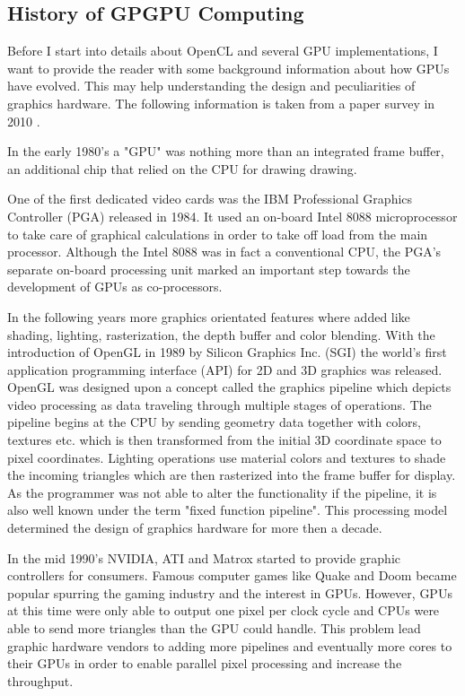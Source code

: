 \subsection{History of GPGPU Computing} 
\label{sec:history}
Before I start into details about OpenCL and several GPU implementations, I want to provide the reader with some background information about how GPUs have evolved. This may help understanding the design and peculiarities of graphics hardware. The following information is taken from a paper survey in 2010 \cite{gpu_history}.

In the early 1980's a "GPU" was nothing more than an integrated frame buffer, an additional chip that relied on the CPU for drawing drawing.

One of the first dedicated video cards was the IBM Professional Graphics Controller (PGA) released in 1984. It used an on-board Intel 8088 microprocessor to take care of graphical calculations in order to take off load from the main processor. Although the Intel 8088 was in fact a conventional CPU, the PGA's separate on-board processing unit marked an important step towards the development of GPUs as co-processors.

In the following years more graphics orientated features where added like shading, lighting, rasterization, the depth buffer and color blending. With the introduction of OpenGL in 1989 by Silicon Graphics Inc. (SGI) the world's first application programming interface (API) for 2D and 3D graphics was released. OpenGL was designed upon a concept called the graphics pipeline which depicts video processing as data traveling through multiple stages of operations. The pipeline begins at the CPU by sending geometry data together with colors, textures etc. which is then transformed from the initial 3D coordinate space to pixel coordinates. Lighting operations use material colors and textures to shade the incoming triangles which are then rasterized into the frame buffer for display. As the programmer was not able to alter the functionality if the pipeline, it is also well known under the term "fixed function pipeline". This processing model determined the design of graphics hardware for more then a decade.

In the mid 1990's NVIDIA, ATI and Matrox started to provide graphic controllers for consumers. Famous computer games like Quake and Doom became popular spurring the gaming industry and the interest in GPUs. However, GPUs at this time were only able to output one pixel per clock cycle and CPUs were able to send more triangles than the GPU could handle. This problem lead graphic hardware vendors to adding more pipelines and eventually more cores to their GPUs in order to enable parallel pixel processing and increase the throughput.

